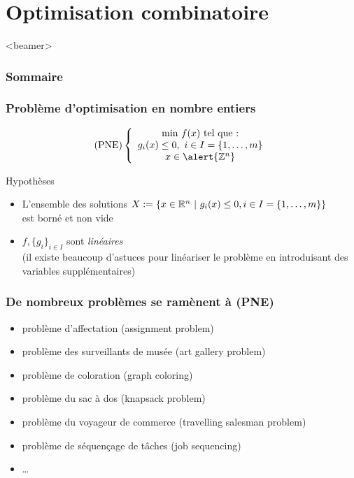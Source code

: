 \documentclass{beamer}
\newcommand{\Z}{{\ensuremath\mathbb{Z}}}
\newcommand{\R}{{\ensuremath\mathbb{R}}}
\begin{document}

\section{Optimisation combinatoire}

\begin{frame}<beamer>
  \frametitle{Sommaire}
  \tableofcontents[currentsection]
\end{frame}

\begin{frame}
  \frametitle{Problème d'optimisation en nombre entiers}
  
  \[
  \text{(PNE)} \left\{
  \begin{array}{c}
    \text{min} \ f(x) \ \text{tel que :} \\
    g_i(x) \leq 0, \ i \in I = \{1, \dots, m\} \\
    x \in \alert{\Z^n}
  \end{array}
  \right.
  \]

  \begin{block}{Hypothèses}
    \begin{itemize}
    \item L'ensemble des solutions $X := \{ x \in \R^n \ | \ g_i(x) \leq 0, i \in I = \{1, \dots, m\} \}$ \\
      est borné et non vide
    \item $f, \{g_i\}_{i \in I}$ sont \emph{linéaires} \\
      (il existe beaucoup d'astuces pour
      linéariser le problème en introduisant des variables supplémentaires)
    \end{itemize}
  \end{block}
\end{frame}

\begin{frame}
  \frametitle{De nombreux problèmes se ramènent à (PNE)}

  \begin{itemize}
    \item problème d'affectation (assignment problem)
    \item problème des surveillants de musée (art gallery problem)
    \item problème de coloration (graph coloring)
    \item problème du sac à dos (knapsack problem)
    \item problème du voyageur de commerce (travelling salesman problem)
    \item problème de séquençage de tâches (job sequencing)
    \item \dots
  \end{itemize}
  
\end{frame}
\end{document}
